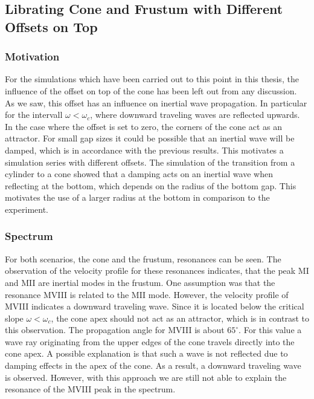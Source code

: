 \clearpage

\subsection{Librating Cone and Frustum with Different Offsets on Top}

\subsubsection{Motivation}

For the simulations which have been carried out to this point in this thesis,
the influence of the offset on top of the cone has been left out from any discussion.
As we saw, this offset has an influence on inertial wave propagation.
In particular for the intervall $\omega<\omega_c$, where  downward traveling waves are
reflected upwards.
In the case where the offset is set to zero, the corners of the cone act as an attractor.
For small gap sizes it could be possible that an inertial wave will be damped,
which is in accordance with the previous results.
This motivates a simulation series with different offsets.
The simulation of the transition from a cylinder to a cone showed
that a damping acts on an inertial wave when reflecting at the bottom,
which  depends on the radius of the bottom gap.
This motivates the use of a larger radius at the bottom in comparison to the experiment.

\subsubsection{Spectrum}

For both scenarios, the cone and the frustum, resonances can be seen.
The observation of the velocity profile for these resonances indicates,
that the peak M\RN{1} and M\RN{2} are inertial modes in the frustum.
One assumption was that the resonance M\RN{8} is related to the M\RN{2} mode.
However, the velocity profile of M\RN{8} indicates a downward traveling wave.
Since it is located below the critical slope $\omega < \omega_c$, the cone apex
should not act as an attractor, which is in contrast to this observation.
The propagation angle for M\RN{8} is about $65^\circ$.
For this value a wave ray originating from the upper edges of the cone travels directly
into the cone apex.
A possible explanation is that such a wave is not reflected due to damping effects in
the apex of the cone. As a result, a downward traveling wave is observed.
However, with this approach we are still not able to explain the resonance of the M\RN{8} peak
in the spectrum.

